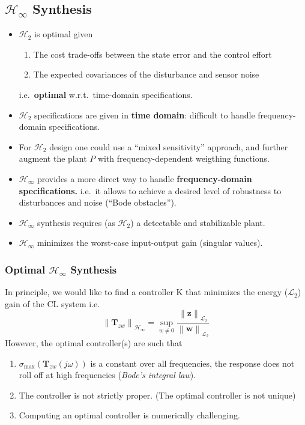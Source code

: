 \subsection{\texorpdfstring{$\mathcal{H}_\infty$}{H-infinity} Synthesis}
\begin{itemize}
    \item $\mathcal{H}_2$ is optimal given
          \begin{enumerate}
              \item The cost trade-offs between the state error and the control effort
              \item The expected covariances of the disturbance and sensor noise
          \end{enumerate} i.e.\ \textbf{optimal} w.r.t.\ time-domain specifications.
    \item $\mathcal{H}_2$ specifications are given in \textbf{time domain}: difficult to handle frequency-domain specifications.
    \item For $\mathcal{H}_2$ design one could use a ``mixed sensitivity'' approach, and further augment the plant $P$ with frequency-dependent weigthing functions.
    \item $\mathcal{H}_\infty$ provides a more direct way to handle \textbf{frequency-domain specifications.} i.e.\ it allows to achieve a desired level of robustness to disturbances and noise (``Bode obstacles'').
\end{itemize}

\newpar{}
\begin{itemize}
    \item $\mathcal{H}_\infty$ synthesis requires (as $\mathcal{H}_2$) a detectable and stabilizable plant.
    \item $\mathcal{H}_\infty$ minimizes the worst-case input-output gain (singular values).
\end{itemize}

\subsubsection{Optimal \texorpdfstring{$\mathcal{H}_\infty$}{H-infinity} Synthesis}
In principle, we would like to find a controller K that minimizes the energy ($\mathcal{L}_2$) gain of the CL system i.e.
\begin{equation*}
    \left\|\mathbf{T}_{zw}\right\|_{\mathcal{H}_\infty}=\sup_{w\neq0}\frac{\left\|\mathbf{z}\right\|_{\mathcal{L}_2}}{\left\|\mathbf{w}\right\|_{\mathcal{L}_2}}
\end{equation*}
However, the optimal controller(s) are such that
\begin{enumerate}
    \item $\sigma_{\max}(\mathbf{T}_{zw}(j\omega))$ is a constant over all frequencies, the response does not roll off at high frequencies (\textit{Bode's integral law}).
    \item The controller is not strictly proper. (The optimal controller is not unique)
    \item Computing an optimal controller is numerically challenging.
\end{enumerate}

